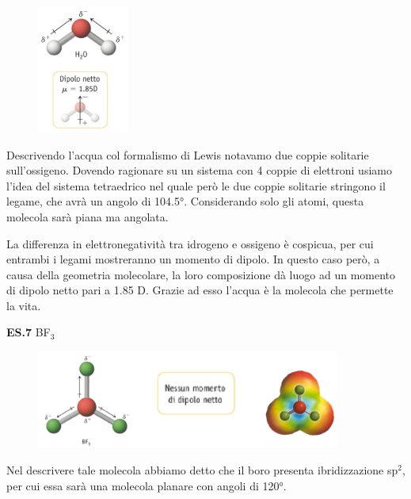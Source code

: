 \hspace{0.5cm}\begin{minipage}{0.2\textwidth}
    \begin{figure}[H]
    \includegraphics[width=3cm]{immagini/H_2O.png}
    \end{figure}
    \end{minipage} \hfill
    \begin{minipage}{0.65\textwidth}
    \vspace{0.6cm}Descrivendo l'acqua col formalismo di Lewis notavamo due coppie solitarie sull'ossigeno. Dovendo ragionare su un sistema con 4 coppie di elettroni usiamo l'idea del sistema tetraedrico nel quale però le due coppie solitarie stringono il legame, che avrà un angolo di 104.5°. Considerando solo gli atomi, questa molecola sarà piana ma angolata.

    La differenza in elettronegatività tra idrogeno e ossigeno è cospicua, per cui entrambi i legami mostreranno un momento di dipolo. In questo caso però, a causa della geometria molecolare, la loro composizione dà luogo ad un momento di dipolo netto pari a 1.85 D. Grazie ad esso l'acqua è la molecola che permette la vita.    
    \end{minipage}

\vspace{0.2cm}\textbf{ES.7} BF$_3$

\begin{figure}[htp]
    \centering
    \includegraphics[width=10cm]{immagini/BF_3-dipolo.png}
\end{figure}

Nel descrivere tale molecola abbiamo detto che il boro presenta ibridizzazione sp$^2$, per cui essa sarà una molecola planare con angoli di 120°.

